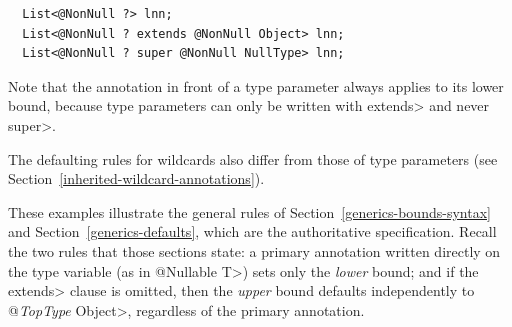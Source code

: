 \begin{Verbatim}
  List<@NonNull ?> lnn;
  List<@NonNull ? extends @NonNull Object> lnn;
  List<@NonNull ? super @NonNull NullType> lnn;
\end{Verbatim}

\noindent
Note that the annotation in front of a type parameter always applies to its
lower bound, because type parameters can only be written with \<extends>
and never \<super>.



The defaulting rules for
wildcards also differ from those of type parameters (see
Section~\ref{inherited-wildcard-annotations}).


%
%
%
%



These examples illustrate the general rules of
Section~\ref{generics-bounds-syntax} and Section~\ref{generics-defaults},
which are the authoritative specification.  Recall the two rules that those
sections state:  a primary annotation written directly on the type variable
(as in \<@Nullable T>) sets only the \emph{lower} bound; and if the
\<extends> clause is omitted, then the \emph{upper} bound defaults
independently to \<@\emph{TopType} Object>, regardless of the primary
annotation.

